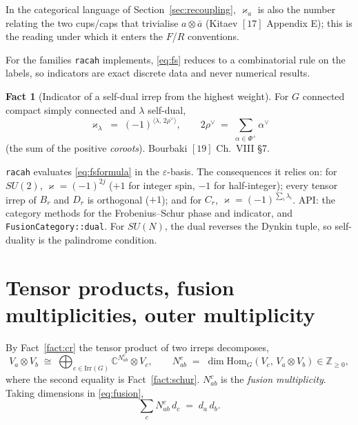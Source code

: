 \documentclass[11pt,a4paper]{article}
\theoremstyle{plain}
\theoremstyle{definition}
\newtheorem{fact}[theorem]{Fact}
\newcommand{\Irr}{\mathrm{Irr}}
\newcommand{\Hom}{\mathrm{Hom}}
\newcommand{\ZZ}{\mathbb{Z}}
\newcommand{\CC}{\mathbb{C}}
\newcommand{\dual}[1]{\bar{#1}}
\newcommand{\code}[1]{\texttt{#1}}
\begin{document}
In the categorical language of Section~\ref{sec:recoupling}, $\varkappa_a$ is
also the number relating the two cups/caps that trivialise $a\otimes\dual a$
(Kitaev $[17]$ Appendix E); this is the reading under which it enters the
$F$/$R$ conventions.

For the families \code{racah} implements, \eqref{eq:fs} reduces to a
combinatorial rule on the labels, so indicators are exact discrete data and
never numerical results.

\begin{fact}[Indicator of a self-dual irrep from the highest weight]
\label{fact:fsformula}
For $G$ connected compact simply connected and $\lambda$ self-dual,
\begin{equation}\label{eq:fsformula}
  \varkappa_\lambda \;=\; (-1)^{\langle \lambda,\, 2\rho^\vee\rangle},
  \qquad
  2\rho^\vee \;=\; \sum_{\alpha\in\Phi^+}\alpha^\vee
\end{equation}
(the sum of the positive \emph{coroots}). Bourbaki $[19]$ Ch.~VIII \S7.
\end{fact}

\code{racah} evaluates \eqref{eq:fsformula} in the $\varepsilon$-basis. The
consequences it relies on: for $SU(2)$, $\varkappa = (-1)^{2j}$ ($+1$ for
integer spin, $-1$ for half-integer); every tensor irrep of $B_r$ and $D_r$ is
orthogonal ($+1$); and for $C_r$, $\varkappa = (-1)^{\sum_i \lambda_i}$.
API: the category methods for the Frobenius--Schur phase and indicator,
and \code{FusionCategory::dual}. For $SU(N)$, the dual reverses the Dynkin
tuple, so self-duality is the palindrome condition.

\section{Tensor products, fusion multiplicities, outer multiplicity}
\label{sec:fusion}

By Fact~\ref{fact:cr} the tensor product of two irreps decomposes,
\begin{equation}\label{eq:fusion}
  V_a \otimes V_b \;\cong\; \bigoplus_{c\in\Irr(G)} \CC^{N^c_{ab}} \otimes V_c,
  \qquad
  N^c_{ab} \;=\; \dim \Hom_G(V_c,\, V_a\otimes V_b) \in \ZZ_{\ge 0},
\end{equation}
where the second equality is Fact~\ref{fact:schur}. $N^c_{ab}$ is the
\emph{fusion multiplicity}. Taking dimensions in \eqref{eq:fusion},
\begin{equation}\label{eq:dimcount}
  \sum_c N^c_{ab}\, d_c \;=\; d_a\, d_b .
\end{equation}
\end{document}

